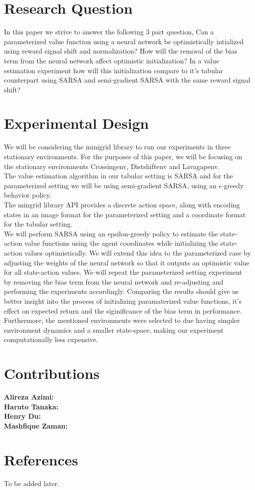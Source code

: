 \documentclass{article}
\theoremstyle{plain}
\theoremstyle{definition}
\theoremstyle{remark}
\begin{document}
\section{Research Question}
In this paper we strive to answer the following 3 part question,
Can a parameterized value function using a neural network be optimistically intialized using reward signal shift and normalization?
How will the removal of the bias term from the neural network affect optimistic initialization?
In a value estimation experiment how will this initialization compare to it's tabular counterpart using 
SARSA and semi-gradient SARSA with the same reward signal shift?
\section{Experimental Design}
We will be considering the minigrid library to run our experiments in three stationary environments. For the purposes of this paper, we will be focusing on the stationary environments
Crossingenv, Distshiftenv and Lavagapenv.\\
The value estimation algorithm in our tabular setting is SARSA and for the parameterized setting we will be using
semi-gradient SARSA, using an $\epsilon$-greedy behavior policy.\\
The mingrid library API provides a discrete action space, along with encoding states in an image format for the 
parameterized setting and a coordinate format for the tabular setting.\\
We will perform SARSA using an epsilon-greedy policy to estimate the state-action value functions using the agent coordinates while initializing the state-action 
values optimistically. We will extend this idea to the parameterized case by adjusting the weights of the neural
network so that it outputs an optimistic value for all state-action values. We will repeat the parameterized
setting experiment by removing the bias term from the neural network and re-adjusting and performing the experiments accordingly.
Comparing the results should give us better insight into the process of initializing paramaterized value functions, it's effect on 
expected return and the siginificance of the bias term in performance.\\
Furthermore, the mentioned environments were selected to due having simpler environment dynamics and a smaller state-space, making our experiment computationally less expensive.


\section{Contributions}
\textbf{Alireza Azimi:}\\
\textbf{Haruto Tanaka:}\\
\textbf{Henry Du:}\\
\textbf{Mashfique Zaman:}\\

\section{References}
To be added later.
\nocite{langley00}



\end{document}

